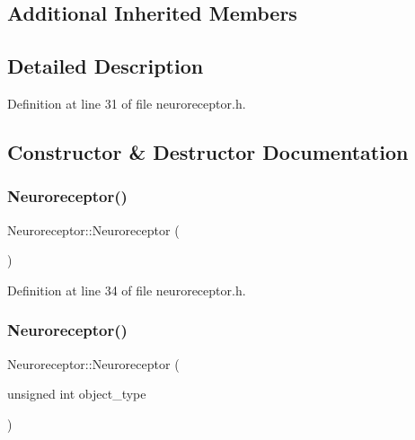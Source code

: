 \subsection*{Additional Inherited Members}


\subsection{Detailed Description}


Definition at line 31 of file neuroreceptor.\+h.



\subsection{Constructor \& Destructor Documentation}
\mbox{\label{class_neuroreceptor_a70d2c87f9932f6fc113da815b6aecb7f}} 
\subsubsection{\texorpdfstring{Neuroreceptor()}{Neuroreceptor()}\hspace{0.1cm}{\footnotesize\ttfamily [1/4]}}
{\footnotesize\ttfamily Neuroreceptor\+::\+Neuroreceptor (\begin{DoxyParamCaption}{ }\end{DoxyParamCaption})\hspace{0.3cm}{\ttfamily [inline]}}



Definition at line 34 of file neuroreceptor.\+h.

\mbox{\label{class_neuroreceptor_a4628bf1ab69e010dc42b3adfd4dee72b}} 
\subsubsection{\texorpdfstring{Neuroreceptor()}{Neuroreceptor()}\hspace{0.1cm}{\footnotesize\ttfamily [2/4]}}
{\footnotesize\ttfamily Neuroreceptor\+::\+Neuroreceptor (\begin{DoxyParamCaption}\item[{unsigned int}]{object\+\_\+type }\end{DoxyParamCaption})\hspace{0.3cm}{\ttfamily [inline]}}



